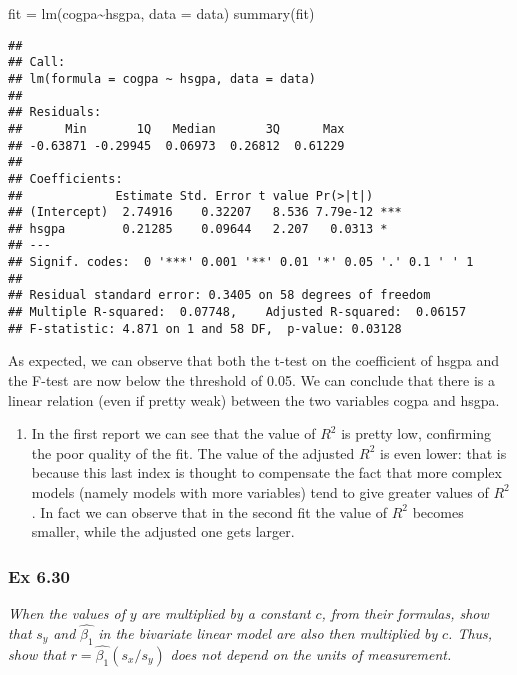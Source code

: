 \documentclass[
]{article}
\newenvironment{Shaded}{\begin{snugshade}}{\end{snugshade}}
\newcommand{\AttributeTok}[1]{\textcolor[rgb]{0.77,0.63,0.00}{#1}}
\newcommand{\FunctionTok}[1]{\textcolor[rgb]{0.00,0.00,0.00}{#1}}
\newcommand{\NormalTok}[1]{#1}
\newcommand{\OtherTok}[1]{\textcolor[rgb]{0.56,0.35,0.01}{#1}}
\newcommand{\SpecialCharTok}[1]{\textcolor[rgb]{0.00,0.00,0.00}{#1}}
\providecommand{\tightlist}{%
  \setlength{\itemsep}{0pt}\setlength{\parskip}{0pt}}
\begin{document}
\begin{Shaded}
\begin{Highlighting}[]
\NormalTok{fit }\OtherTok{=} \FunctionTok{lm}\NormalTok{(cogpa}\SpecialCharTok{\textasciitilde{}}\NormalTok{hsgpa, }\AttributeTok{data =}\NormalTok{ data)}
\FunctionTok{summary}\NormalTok{(fit)}
\end{Highlighting}
\end{Shaded}

\begin{verbatim}
## 
## Call:
## lm(formula = cogpa ~ hsgpa, data = data)
## 
## Residuals:
##      Min       1Q   Median       3Q      Max 
## -0.63871 -0.29945  0.06973  0.26812  0.61229 
## 
## Coefficients:
##             Estimate Std. Error t value Pr(>|t|)    
## (Intercept)  2.74916    0.32207   8.536 7.79e-12 ***
## hsgpa        0.21285    0.09644   2.207   0.0313 *  
## ---
## Signif. codes:  0 '***' 0.001 '**' 0.01 '*' 0.05 '.' 0.1 ' ' 1
## 
## Residual standard error: 0.3405 on 58 degrees of freedom
## Multiple R-squared:  0.07748,    Adjusted R-squared:  0.06157 
## F-statistic: 4.871 on 1 and 58 DF,  p-value: 0.03128
\end{verbatim}

As expected, we can observe that both the t-test on the coefficient of
hsgpa and the F-test are now below the threshold of 0.05. We can
conclude that there is a linear relation (even if pretty weak) between
the two variables cogpa and hsgpa.

\begin{enumerate}
\def\labelenumi{\alph{enumi})}
\setcounter{enumi}{2}
\tightlist
\item
  In the first report we can see that the value of \(R^2\) is pretty
  low, confirming the poor quality of the fit. The value of the adjusted
  \(R^2\) is even lower: that is because this last index is thought to
  compensate the fact that more complex models (namely models with more
  variables) tend to give greater values of \(R^2\). In fact we can
  observe that in the second fit the value of \(R^2\) becomes smaller,
  while the adjusted one gets larger.
\end{enumerate}

\hypertarget{ex-6.30}{%
\subsubsection{Ex 6.30}\label{ex-6.30}}

\emph{When the values of} \(y\) \emph{are multiplied by a constant}
\(c\)\emph{, from their formulas, show that} \(s_y\) \emph{and}
\(\hat{\beta_1}\) \emph{in the bivariate linear model are also then
multiplied by} \(c\)\emph{. Thus, show that}
\(r = \hat{\beta_1}(s_x/s_y)\) \emph{does not depend on the units of
measurement.}
\end{document}

